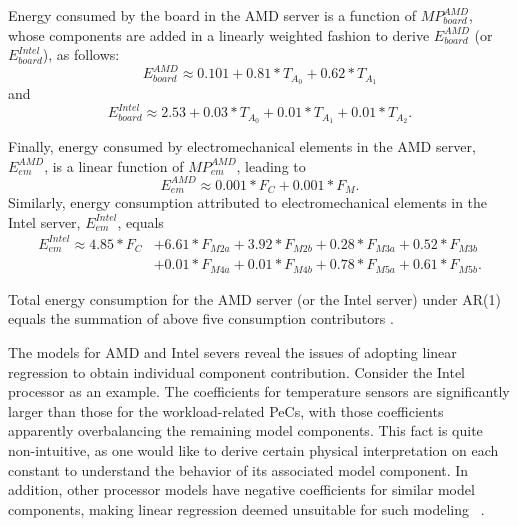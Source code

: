 \documentclass[prodmode,acmtaco,pdftex]{acmsmall}
\begin{document}
Energy consumed by the board in the AMD server is a function of $MP_{board}^{AMD}$,
whose components are added in a linearly weighted fashion to derive
$E_{board}^{AMD}$ (or $E_{board}^{Intel}$), as follows:
\begin{equation*}
E_{board}^{AMD} \approx 0.101+0.81*T_{A_{0}}+0.62*T_{A_{1}}
\end{equation*}
and
\begin{equation*}
E_{board}^{Intel} \approx 2.53+0.03*T_{A_{0}}+0.01*T_{A_{1}}+0.01*T_{A_{2}}.
\end{equation*}

Finally, energy consumed by electromechanical elements in the AMD server, $E_{em}^{AMD}$,
is a linear function of $MP_{em}^{AMD}$, leading to
\begin{equation*}
E_{em}^{AMD} \approx 0.001*F_{C}+0.001*F_{M}.
\end{equation*}
Similarly, energy consumption attributed to electromechanical elements in the Intel server, $E_{em}^{Intel}$, equals
\begin{align*}
E_{em}^{Intel}\approx4.85*F_{C}&+6.61*F_{M2a}+3.92*F_{M2b}+0.28*F_{M3a}+0.52*F_{M3b}\\
            &+0.01*F_{M4a}+0.01*F_{M4b}+0.78*F_{M5a}+0.61*F_{M5b}.
\end{align*}

Total energy consumption for the AMD server (or the Intel server)
under AR(1) equals the summation of above five consumption contributors
\cite{Lewis2008}.

The models for AMD and Intel severs reveal the issues of adopting linear
regression to obtain individual component contribution.  Consider the
Intel processor as an example.  The coefficients for temperature sensors
are significantly larger than those for the workload-related PeCs, with
those coefficients apparently overbalancing the remaining model
components.  This fact is quite non-intuitive, as one would like to
derive certain physical interpretation on each constant to understand
the behavior of its associated model component.  In addition, other
processor models have negative coefficients for similar model
components, making linear regression deemed unsuitable for such modeling
~\cite{Bertran2010,McCullough2011}.

\end{document}

